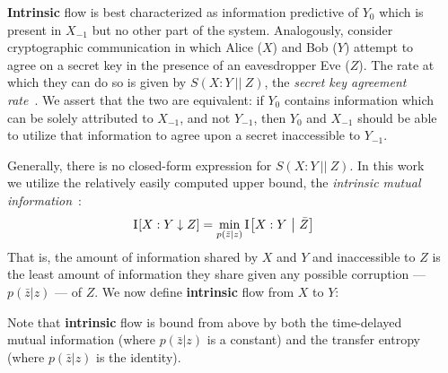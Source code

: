 \documentclass[final,serif,hyperref={pdfpagelabels=false}]{beamer}
\newcommand{\intrinsic}{\textcolor{id}{\textbf{\vphantom{gh}intrinsic}}\xspace}
\newcommand{\Intrinsic}{\textcolor{id}{\textbf{\vphantom{gh}Intrinsic}}\xspace}
\newcommand{\Xpast}{\ensuremath{X_{-1}}\xspace}
\newcommand{\Ypast}{\ensuremath{Y_{-1}}\xspace}
\newcommand{\Ypres}{\ensuremath{Y_{0}}\xspace}
\newcommand{\SKAR}{\ensuremath{S(X : Y ~||~ Z)}\xspace}
\renewcommand{\ITE}{\I{\Xpast : \Ypres \downarrow \Ypast}\xspace}
\newcommand{\sepb}{1.35cm}
\begin{document}
\begin{frame}[fragile]{}
\begin{columns}[T]
\begin{column}{.32\paperwidth}
\begin{tcolorbox}[title=Relationship to Extant Measures]
    \end{tcolorbox}

  \end{column}

  \begin{column}{.32\paperwidth}

    \begin{tcolorbox}[title=Intrinsic Flow as Cryptographic Secrecy]
      \Intrinsic flow is best characterized as information predictive of \Ypres which is present in \Xpast but no other part of the system. Analogously, consider cryptographic communication in which Alice ($X$) and Bob ($Y$) attempt to agree on a secret key in the presence of an eavesdropper Eve ($Z$). The rate at which they can do so is given by \SKAR, the \emph{secret key agreement rate}~\cite{maurer1993secret}. We assert that the two are equivalent: if \Ypres contains information which can be solely attributed to \Xpast, and not \Ypast, then \Ypres and \Xpast should be able to utilize that information to agree upon a secret inaccessible to \Ypast.

      Generally, there is no closed-form expression for \SKAR. In this work we utilize the relatively easily computed upper bound, the \emph{intrinsic mutual information}~\cite{maurer1999unconditionally}:
      \begin{align*}
        \I{X : Y \downarrow Z} = \min_{p(\bar{z}|z)} \I{X : Y \mid \bar{Z}}
      \end{align*}
      That is, the amount of information shared by $X$ and $Y$ and inaccessible to $Z$ is the least amount of information they share given any possible corruption --- $p(\bar{z}|z)$ --- of $Z$. We now define \intrinsic flow from $X$ to $Y$:

      \begin{description}
        \item[Intrinsic Flow:] \ITE
      \end{description}

      Note that \intrinsic flow is bound from above by both the time-delayed mutual information (where $p(\bar{z}|z)$ is a constant) and the transfer entropy (where $p(\bar{z}|z)$ is the identity).
    \end{tcolorbox}

    \vspace{\sepb}

    \begin{tcolorbox}[title=Measures Applied to Canonical Flows]


\end{tcolorbox}
\end{column}
\end{columns}
\end{frame}
\end{document}
